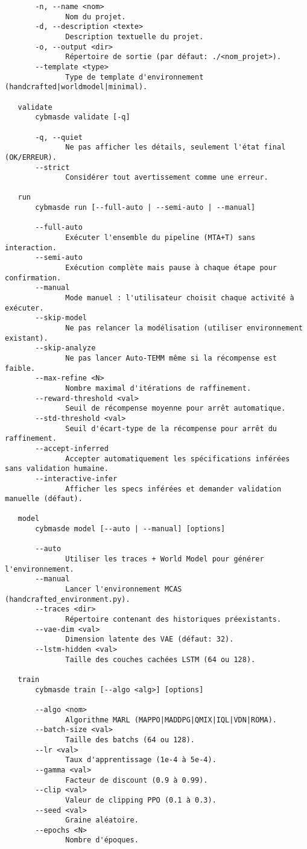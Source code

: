 \begin{verbatim}
       -n, --name <nom>
              Nom du projet.
       -d, --description <texte>
              Description textuelle du projet.
       -o, --output <dir>
              Répertoire de sortie (par défaut: ./<nom_projet>).
       --template <type>
              Type de template d'environnement (handcrafted|worldmodel|minimal).

   validate
       cybmasde validate [-q]

       -q, --quiet
              Ne pas afficher les détails, seulement l'état final (OK/ERREUR).
       --strict
              Considérer tout avertissement comme une erreur.

   run
       cybmasde run [--full-auto | --semi-auto | --manual]

       --full-auto
              Exécuter l'ensemble du pipeline (MTA+T) sans interaction.
       --semi-auto
              Exécution complète mais pause à chaque étape pour confirmation.
       --manual
              Mode manuel : l'utilisateur choisit chaque activité à exécuter.
       --skip-model
              Ne pas relancer la modélisation (utiliser environnement existant).
       --skip-analyze
              Ne pas lancer Auto-TEMM même si la récompense est faible.
       --max-refine <N>
              Nombre maximal d'itérations de raffinement.
       --reward-threshold <val>
              Seuil de récompense moyenne pour arrêt automatique.
       --std-threshold <val>
              Seuil d'écart-type de la récompense pour arrêt du raffinement.
       --accept-inferred
              Accepter automatiquement les spécifications inférées sans validation humaine.
       --interactive-infer
              Afficher les specs inférées et demander validation manuelle (défaut).

   model
       cybmasde model [--auto | --manual] [options]

       --auto
              Utiliser les traces + World Model pour générer l'environnement.
       --manual
              Lancer l'environnement MCAS (handcrafted_environment.py).
       --traces <dir>
              Répertoire contenant des historiques préexistants.
       --vae-dim <val>
              Dimension latente des VAE (défaut: 32).
       --lstm-hidden <val>
              Taille des couches cachées LSTM (64 ou 128).

   train
       cybmasde train [--algo <alg>] [options]

       --algo <nom>
              Algorithme MARL (MAPPO|MADDPG|QMIX|IQL|VDN|ROMA).
       --batch-size <val>
              Taille des batchs (64 ou 128).
       --lr <val>
              Taux d'apprentissage (1e-4 à 5e-4).
       --gamma <val>
              Facteur de discount (0.9 à 0.99).
       --clip <val>
              Valeur de clipping PPO (0.1 à 0.3).
       --seed <val>
              Graine aléatoire.
       --epochs <N>
              Nombre d'époques.


\end{verbatim}
